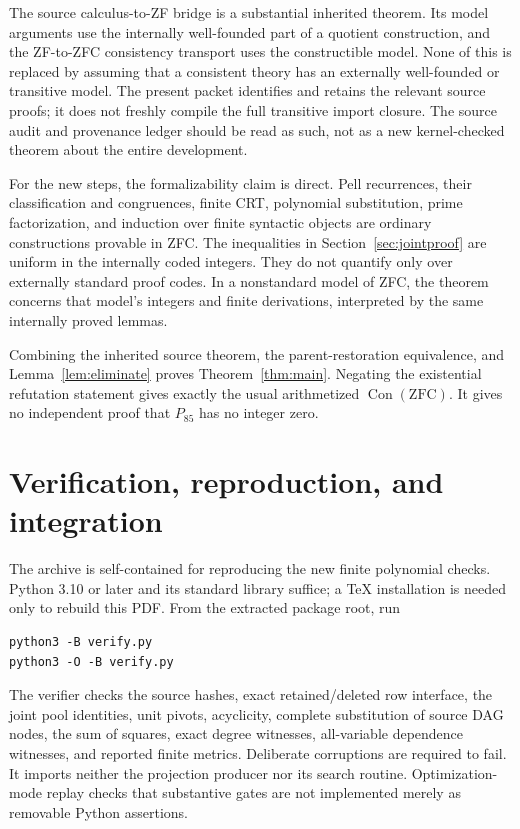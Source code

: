 \documentclass[11pt]{article}
\theoremstyle{definition}\newtheorem{definition}[theorem]{Definition}
\theoremstyle{remark}\newtheorem{remark}[theorem]{Remark}
\newcommand{\Con}{\operatorname{Con}}\newcommand{\ZFC}{\mathrm{ZFC}}
\begin{document}
The source calculus-to-ZF bridge is a substantial inherited theorem.
Its model arguments use the internally well-founded part of a
quotient construction, and the ZF-to-ZFC consistency transport uses
the constructible model. None of this is replaced by assuming that
a consistent theory has an externally well-founded or transitive
model. The present packet identifies and retains the relevant source
proofs; it does not freshly compile the full transitive import closure.
The source audit and provenance ledger should be read as such, not
as a new kernel-checked theorem about the entire development.

For the new steps, the formalizability claim is direct. Pell
recurrences, their classification and congruences, finite CRT,
polynomial substitution, prime factorization, and induction over
finite syntactic objects are ordinary constructions provable in ZFC.
The inequalities in Section~\ref{sec:jointproof} are uniform in the
internally coded integers. They do not quantify only over externally
standard proof codes. In a nonstandard model of ZFC, the theorem
concerns that model's integers and finite derivations, interpreted by
the same internally proved lemmas.

Combining the inherited source theorem, the parent-restoration
equivalence, and Lemma~\ref{lem:eliminate} proves
Theorem~\ref{thm:main}. Negating the existential refutation statement
gives exactly the usual arithmetized $\Con(\ZFC)$. It gives no
independent proof that $P_{85}$ has no integer zero.

\section{Verification, reproduction, and integration}
\label{sec:verification}

The archive is self-contained for reproducing the new finite
polynomial checks. Python 3.10 or later and its standard library
suffice; a TeX installation is needed only to rebuild this PDF.
From the extracted package root, run
\begin{verbatim}
python3 -B verify.py
python3 -O -B verify.py
\end{verbatim}
The verifier checks the source hashes, exact retained/deleted row
interface, the joint pool identities, unit pivots, acyclicity,
complete substitution of source DAG nodes, the sum of squares,
exact degree witnesses, all-variable dependence witnesses, and
reported finite metrics. Deliberate corruptions are required to fail.
It imports neither the projection producer nor its search routine.
Optimization-mode replay checks that substantive gates are not
implemented merely as removable Python assertions.
\end{document}
